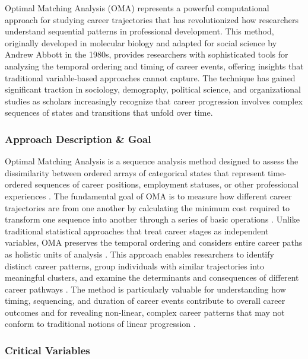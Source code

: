 \documentclass[../main.tex]{subfiles}
\begin{document}
Optimal Matching Analysis (OMA) represents a powerful computational approach for studying career trajectories that has revolutionized how researchers understand sequential patterns in professional development. This method, originally developed in molecular biology and adapted for social science by Andrew Abbott in the 1980s, provides researchers with sophisticated tools for analyzing the temporal ordering and timing of career events, offering insights that traditional variable-based approaches cannot capture. The technique has gained significant traction in sociology, demography, political science, and organizational studies as scholars increasingly recognize that career progression involves complex sequences of states and transitions that unfold over time.

\subsubsection{Approach Description \& Goal}

Optimal Matching Analysis is a sequence analysis method designed to assess the dissimilarity between ordered arrays of categorical states that represent time-ordered sequences of career positions, employment statuses, or other professional experiences \citep{wikipedia_optimal_matching}. The fundamental goal of OMA is to measure how different career trajectories are from one another by calculating the minimum cost required to transform one sequence into another through a series of basic operations \citep{wikipedia_optimal_matching}. Unlike traditional statistical approaches that treat career stages as independent variables, OMA preserves the temporal ordering and considers entire career paths as holistic units of analysis \citep{vannoni_john_career_progression}. This approach enables researchers to identify distinct career patterns, group individuals with similar trajectories into meaningful clusters, and examine the determinants and consequences of different career pathways \citep{mapping_career_patterns}. The method is particularly valuable for understanding how timing, sequencing, and duration of career events contribute to overall career outcomes and for revealing non-linear, complex career patterns that may not conform to traditional notions of linear progression \citep{sequence_analysis_social_science}.

\subsubsection{Critical Variables}
\end{document}
